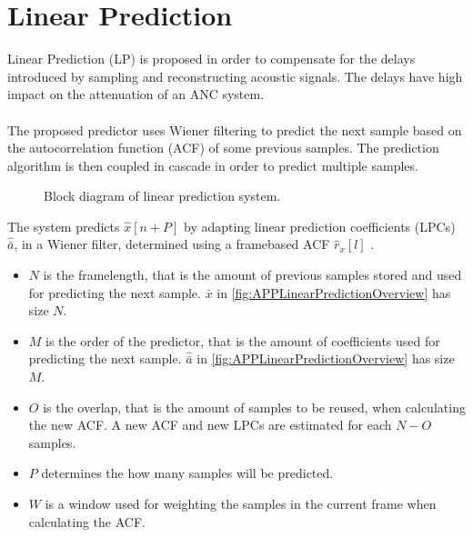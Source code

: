 \section{Linear Prediction}
Linear Prediction (LP) is proposed in order to compensate for the delays introduced by sampling and reconstructing acoustic signals. The delays have high impact on the attenuation of an ANC system. \\\\
The proposed predictor uses Wiener filtering to predict the next sample based on the autocorrelation function (ACF) of some previous samples. The prediction algorithm is then coupled in cascade in order to predict multiple samples. 

\begin{figure}[H]
	\centering
	
	\caption{Block diagram of linear prediction system.}
	\label{fig:APPLinearPredictionOverview}
\end{figure}
The system predicts $\hat{x}[n+P]$ by adapting linear prediction coefficients (LPCs) $\hat{\bar{a}}$, in a Wiener filter, determined using a framebased ACF $\hat{r}_x[l]$ \cite{LinearPrediction}.

\begin{itemize} 
	\item $N$ is the framelength, that is the amount of previous samples stored and used for predicting the next sample. $\bar{x}$ in \autoref{fig:APPLinearPredictionOverview} has size $N$.
	\item $M$ is the order of the predictor, that is the amount of coefficients used for predicting the next sample. $\hat{\bar{a}}$ in \autoref{fig:APPLinearPredictionOverview} has size $M$.
	\item $O$ is the overlap, that is the amount of samples to be reused, when calculating the new ACF. A new ACF and new LPCs are estimated for each $N-O$ samples.
	\item $P$ determines the how many samples will be predicted. 
	\item $W$ is a window used for weighting the samples in the current frame when calculating the ACF. 
\end{itemize}


